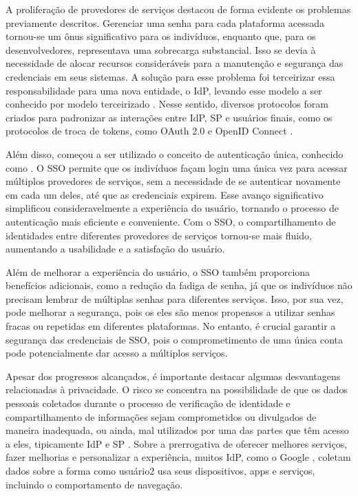 A proliferação de provedores de serviços destacou de forma evidente os problemas previamente descritos. Gerenciar uma senha para cada plataforma acessada tornou-se um ônus significativo para os indivíduos, enquanto que, para os desenvolvedores, representava uma sobrecarga substancial. Isso se devia à necessidade de alocar recursos consideráveis para a manutenção e segurança das credenciais em seus sistemas. A solução para esse problema foi terceirizar essa responsabilidade para uma nova entidade, o \acs{IdP}, levando esse modelo a ser conhecido por modelo terceirizado \cite{revisao-ssi-frederico}. Nesse sentido, diversos protocolos foram criados para padronizar as interações entre \acs{IdP}, \acs{SP} e usuários finais, como os protocolos de troca de tokens, como OAuth 2.0 \cite{oauth} e OpenID Connect \cite{openid}.

Além disso, começou a ser utilizado o conceito de autenticação única, conhecido como . O \acs{SSO} permite que os indivíduos façam login uma única vez para acessar múltiplos provedores de serviços, sem a necessidade de se autenticar novamente em cada um deles, até que as credenciais expirem. Esse avanço significativo simplificou consideravelmente a experiência do usuário, tornando o processo de autenticação mais eficiente e conveniente. Com o \acs{SSO}, o compartilhamento de identidades entre diferentes provedores de serviços tornou-se mais fluido, aumentando a usabilidade e a satisfação do usuário.

Além de melhorar a experiência do usuário, o \acs{SSO} também proporciona benefícios adicionais, como a redução da fadiga de senha, já que os indivíduos não precisam lembrar de múltiplas senhas para diferentes serviços. Isso, por sua vez, pode melhorar a segurança, pois os eles são menos propensos a utilizar senhas fracas ou repetidas em diferentes plataformas. No entanto, é crucial garantir a segurança das credenciais de \acs{SSO}, pois o comprometimento de uma única conta pode potencialmente dar acesso a múltiplos serviços.

Apesar dos progressos alcançados, é importante destacar algumas desvantagens relacionadas à privacidade. O risco se concentra na possibilidade de que os dados pessoais coletados durante o processo de verificação de identidade e compartilhamento de informações sejam comprometidos ou divulgados de maneira inadequada, ou ainda, mal utilizados por uma das partes que têm acesso a eles, tipicamente \acs{IdP} e \acs{SP} \cite{pandey2012investigation}. Sobre a prerrogativa de oferecer melhores serviços, fazer melhorias e personalizar a experiência, muitos \acs{IdP}, como o Google \cite{sidell2020google}, coletam dados sobre a forma como usuário2 usa seus dispositivos, apps e serviços, incluindo o comportamento de navegação.


